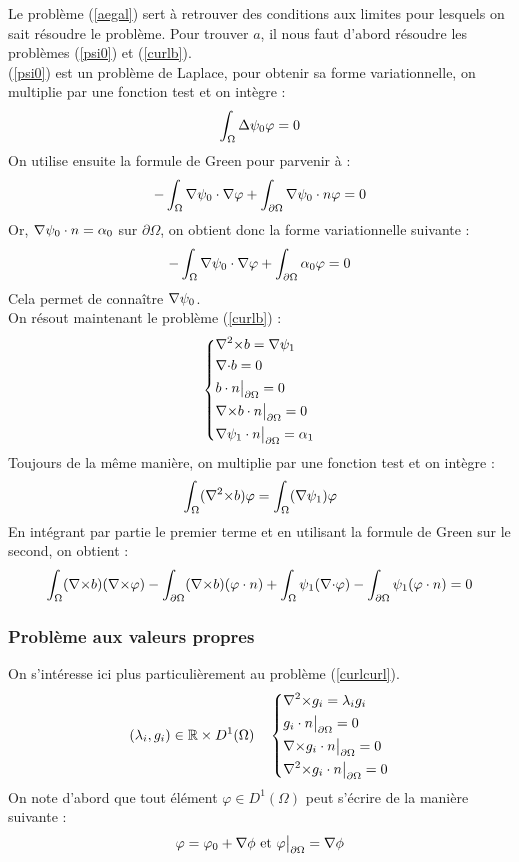 Le problème (\ref{aegal}) sert à retrouver des conditions aux limites pour lesquels on sait résoudre le problème. Pour trouver $a$, il nous faut d'abord résoudre les problèmes (\ref{psi0}) et (\ref{curlb}).\\

(\ref{psi0}) est un problème de Laplace, pour obtenir sa forme variationnelle, on multiplie par une fonction test et on intègre :
\[
\int_\Omega {\Delta}\psi_0 \varphi = 0
\]
On utilise ensuite la formule de Green pour parvenir à :
\[
-\int_\Omega {\nabla}\psi_0\cdot{\nabla}\varphi + \int_{\partial\Omega} {\nabla}\psi_0\cdot n\varphi = 0
\]
Or, ${\nabla}\psi_0\cdot n = \alpha_0$ sur $\partial\Omega$, on obtient donc la forme variationnelle suivante :
\begin{eqnarray}
\label{fvpsi}
-\int_\Omega {\nabla}\psi_0\cdot{\nabla}\varphi + \int_{\partial\Omega} \alpha_0\varphi = 0
\end{eqnarray}
Cela permet de connaître ${\nabla}\psi_0$.\\

On résout maintenant le problème (\ref{curlb}) :
\begin{eqnarray*}
\left\{
\begin{aligned}
&{\nabla^2\times} b = {\nabla}\psi_1\\
&{\nabla\cdot} b = 0\\
&b\cdot n{\big\rvert_{\partial\Omega}} = 0\\
&{\nabla\times} b\cdot n{\big\rvert_{\partial\Omega}} = 0\\
&{\nabla}\psi_1\cdot n{\big\rvert_{\partial\Omega}} = \alpha_1
\end{aligned}
\right.
\end{eqnarray*}
Toujours de la même manière, on multiplie par une fonction test et on intègre :
\[
\int_\Omega ({\nabla^2\times} b) \varphi = \int_\Omega ({\nabla}\psi_1)\varphi
\]
En intégrant par partie le premier terme et en utilisant la formule de Green sur le second, on obtient :
\begin{eqnarray}
\label{fvrelev}
\int_\Omega ({\nabla\times} b)({\nabla\times}\varphi) - \int_{\partial\Omega} ({\nabla\times} b)(\varphi\cdot n) +\int_\Omega \psi_1({\nabla\cdot}\varphi) - \int_{\partial\Omega} \psi_1(\varphi\cdot n) = 0
\end{eqnarray}

\subsubsection{Problème aux valeurs propres}
\label{eigen}

On s'intéresse ici plus particulièrement au problème (\ref{curlcurl}).
\begin{eqnarray*}
(\lambda_i,g_i)\in{\mathbb{R}}\times D^1(\Omega)\quad \left\{
\begin{aligned}
&{\nabla^2\times}  g_i = \lambda_i g_i\\
&g_i\cdot n{\big\rvert_{\partial\Omega}} = 0\\
&{\nabla\times} g_i\cdot n{\big\rvert_{\partial\Omega}} = 0\\
&{\nabla^2\times}  g_i\cdot n{\big\rvert_{\partial\Omega}} = 0
\end{aligned}
\right.
\end{eqnarray*}
On note d'abord que tout élément $\varphi\in D^1(\Omega)$ peut s'écrire de la manière suivante :
\[
\varphi = \varphi_0 + {\nabla}\phi\text{ et } \varphi{\big\rvert_{\partial\Omega}} = {\nabla}\phi
\]

